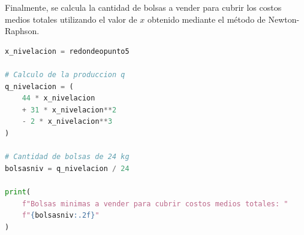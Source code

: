 Finalmente, se calcula la cantidad de bolsas a vender para cubrir los costos medios totales utilizando el valor de $x$ obtenido mediante el método de Newton-Raphson.

\begin{lstlisting}[language=Python,frame=single,caption=Cantidad de bolsas finales,label={cod:calcfinalp5}]
x_nivelacion = redondeopunto5

# Calculo de la produccion q
q_nivelacion = (
    44 * x_nivelacion
    + 31 * x_nivelacion**2
    - 2 * x_nivelacion**3
)

# Cantidad de bolsas de 24 kg
bolsasniv = q_nivelacion / 24

print(
    f"Bolsas minimas a vender para cubrir costos medios totales: "
    f"{bolsasniv:.2f}"
)
\end{lstlisting}
